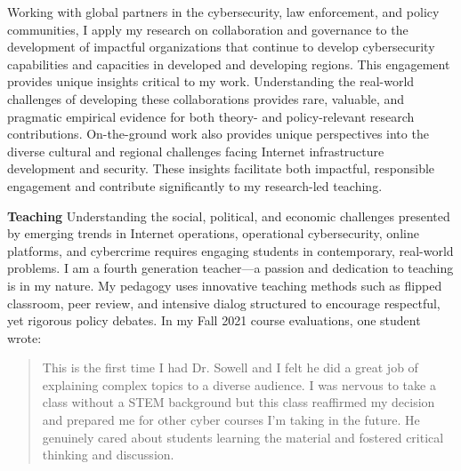 \documentclass[11pt]{letter}
\begin{document}
\begin{letter}
%

%
Working with global partners in the cybersecurity, law enforcement, and policy communities, I apply my research on collaboration and governance to the development of impactful organizations that continue to develop cybersecurity capabilities and capacities in developed and developing regions. 
%
This engagement provides unique insights critical to my work.
%
Understanding the real-world challenges of developing these collaborations provides rare, valuable, and pragmatic empirical evidence for both theory- and policy-relevant research contributions.
%
%
%
%
%
%
On-the-ground work also provides unique perspectives into the diverse cultural and regional challenges facing Internet infrastructure development and security.
%
These insights facilitate both impactful, responsible engagement and contribute significantly to my research-led teaching.


\textbf{Teaching} \vspace{0.2 \baselineskip} \newline %
%
Understanding the social, political, and economic challenges presented by emerging trends in Internet operations, operational cybersecurity, online platforms, and cybercrime requires engaging students in contemporary, real-world problems.
%
I am a fourth generation teacher---a passion and dedication to teaching is in my nature.
%
My pedagogy uses innovative teaching methods such as flipped classroom, peer review, and intensive dialog structured to encourage respectful, yet rigorous policy debates.
%
In my Fall 2021 course evaluations, one student wrote:
%
\begin{quote}
  This is the first time I had Dr. Sowell and I felt he did a great job of explaining complex topics to a diverse audience. I was nervous to take a class without a STEM background but this class reaffirmed my decision and prepared me for other cyber courses I'm taking in the future. He genuinely cared about students learning the material and fostered critical thinking and discussion.
\end{quote}



\end{letter}
\end{document}

